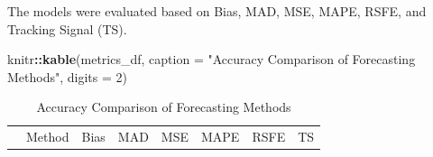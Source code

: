 \documentclass[
]{article}
\newenvironment{Shaded}{\begin{snugshade}}{\end{snugshade}}
\newcommand{\AttributeTok}[1]{\textcolor[rgb]{0.13,0.29,0.53}{#1}}
\newcommand{\DecValTok}[1]{\textcolor[rgb]{0.00,0.00,0.81}{#1}}
\newcommand{\FunctionTok}[1]{\textcolor[rgb]{0.13,0.29,0.53}{\textbf{#1}}}
\newcommand{\NormalTok}[1]{#1}
\newcommand{\SpecialCharTok}[1]{\textcolor[rgb]{0.81,0.36,0.00}{\textbf{#1}}}
\newcommand{\StringTok}[1]{\textcolor[rgb]{0.31,0.60,0.02}{#1}}
\begin{document}
The models were evaluated based on Bias, MAD, MSE, MAPE, RSFE, and
Tracking Signal (TS).

\begin{Shaded}
\begin{Highlighting}[]
\NormalTok{knitr}\SpecialCharTok{::}\FunctionTok{kable}\NormalTok{(metrics\_df, }\AttributeTok{caption =} \StringTok{"Accuracy Comparison of Forecasting Methods"}\NormalTok{, }\AttributeTok{digits =} \DecValTok{2}\NormalTok{)}
\end{Highlighting}
\end{Shaded}

\begin{longtable}[]{@{}
  >{\raggedright\arraybackslash}p{}
  >{\raggedright\arraybackslash}p{}
  >{\raggedleft\arraybackslash}p{}
  >{\raggedleft\arraybackslash}p{}
  >{\raggedleft\arraybackslash}p{}
  >{\raggedleft\arraybackslash}p{}
  >{\raggedleft\arraybackslash}p{}
  >{\raggedleft\arraybackslash}p{}@{}}
\caption{Accuracy Comparison of Forecasting Methods}\tabularnewline
\toprule\noalign{}
\begin{minipage}[b]{\linewidth}\raggedright
\end{minipage} & \begin{minipage}[b]{\linewidth}\raggedright
Method
\end{minipage} & \begin{minipage}[b]{\linewidth}\raggedleft
Bias
\end{minipage} & \begin{minipage}[b]{\linewidth}\raggedleft
MAD
\end{minipage} & \begin{minipage}[b]{\linewidth}\raggedleft
MSE
\end{minipage} & \begin{minipage}[b]{\linewidth}\raggedleft
MAPE
\end{minipage} & \begin{minipage}[b]{\linewidth}\raggedleft
RSFE
\end{minipage} & \begin{minipage}[b]{\linewidth}\raggedleft
TS
\end{minipage} \\

\end{longtable}
\end{document}
